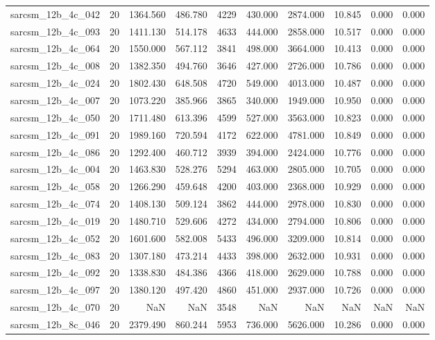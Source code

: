 \begin{tabular}{lrrrrrrrrr}
sarcsm\_12b\_4c\_042 & 20 & 1364.560 & 486.780 & 4229 & 430.000 & 2874.000 & 10.845 & 0.000 & 0.000 \\
sarcsm\_12b\_4c\_093 & 20 & 1411.130 & 514.178 & 4633 & 444.000 & 2858.000 & 10.517 & 0.000 & 0.000 \\
sarcsm\_12b\_4c\_064 & 20 & 1550.000 & 567.112 & 3841 & 498.000 & 3664.000 & 10.413 & 0.000 & 0.000 \\
sarcsm\_12b\_4c\_008 & 20 & 1382.350 & 494.760 & 3646 & 427.000 & 2726.000 & 10.786 & 0.000 & 0.000 \\
sarcsm\_12b\_4c\_024 & 20 & 1802.430 & 648.508 & 4720 & 549.000 & 4013.000 & 10.487 & 0.000 & 0.000 \\
sarcsm\_12b\_4c\_007 & 20 & 1073.220 & 385.966 & 3865 & 340.000 & 1949.000 & 10.950 & 0.000 & 0.000 \\
sarcsm\_12b\_4c\_050 & 20 & 1711.480 & 613.396 & 4599 & 527.000 & 3563.000 & 10.823 & 0.000 & 0.000 \\
sarcsm\_12b\_4c\_091 & 20 & 1989.160 & 720.594 & 4172 & 622.000 & 4781.000 & 10.849 & 0.000 & 0.000 \\
sarcsm\_12b\_4c\_086 & 20 & 1292.400 & 460.712 & 3939 & 394.000 & 2424.000 & 10.776 & 0.000 & 0.000 \\
sarcsm\_12b\_4c\_004 & 20 & 1463.830 & 528.276 & 5294 & 463.000 & 2805.000 & 10.705 & 0.000 & 0.000 \\
sarcsm\_12b\_4c\_058 & 20 & 1266.290 & 459.648 & 4200 & 403.000 & 2368.000 & 10.929 & 0.000 & 0.000 \\
sarcsm\_12b\_4c\_074 & 20 & 1408.130 & 509.124 & 3862 & 444.000 & 2978.000 & 10.830 & 0.000 & 0.000 \\
sarcsm\_12b\_4c\_019 & 20 & 1480.710 & 529.606 & 4272 & 434.000 & 2794.000 & 10.806 & 0.000 & 0.000 \\
sarcsm\_12b\_4c\_052 & 20 & 1601.600 & 582.008 & 5433 & 496.000 & 3209.000 & 10.814 & 0.000 & 0.000 \\
sarcsm\_12b\_4c\_083 & 20 & 1307.180 & 473.214 & 4433 & 398.000 & 2632.000 & 10.931 & 0.000 & 0.000 \\
sarcsm\_12b\_4c\_092 & 20 & 1338.830 & 484.386 & 4366 & 418.000 & 2629.000 & 10.788 & 0.000 & 0.000 \\
sarcsm\_12b\_4c\_097 & 20 & 1380.120 & 497.420 & 4860 & 451.000 & 2937.000 & 10.726 & 0.000 & 0.000 \\
sarcsm\_12b\_4c\_070 & 20 & NaN & NaN & 3548 & NaN & NaN & NaN & NaN & NaN \\
sarcsm\_12b\_8c\_046 & 20 & 2379.490 & 860.244 & 5953 & 736.000 & 5626.000 & 10.286 & 0.000 & 0.000 \\

\end{tabular}
